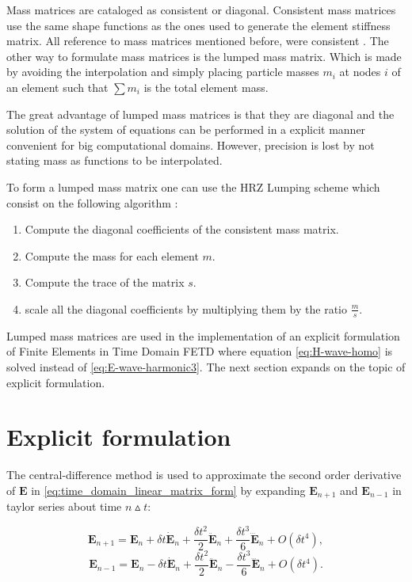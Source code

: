 Mass matrices are cataloged as consistent or diagonal. Consistent mass matrices use the same shape functions as the ones used to generate the element stiffness matrix. All reference to mass matrices mentioned before, were consistent \cite{RobertD.Cook1989}. 
The other way to formulate mass matrices is the lumped mass matrix. Which is made by avoiding the interpolation and simply placing particle masses $m_i$ at nodes $i$ of an element such that $\sum m_i$ is the total element mass. 

The great advantage of lumped mass matrices is that they are diagonal and the solution of the system of equations can be performed in a explicit manner convenient for big computational domains.
However, precision is lost by not stating mass as functions to be interpolated. 

To form a lumped mass matrix one can use the HRZ Lumping scheme 
which consist on the following algorithm \cite{RobertD.Cook1989}:

\begin{enumerate}
\item Compute the diagonal coefficients of the consistent mass matrix.
\item Compute the mass for each element $m$.
\item Compute the trace of the matrix $s$.
\item scale all the diagonal coefficients by multiplying them by the ratio $\frac{m}{s}$.
\end{enumerate}
Lumped mass matrices are used in the implementation of an explicit formulation of Finite Elements in Time Domain FETD where equation \ref{eq:H-wave-homo} is solved instead of \ref{eq:E-wave-harmonic3}. The next section expands on the topic of explicit formulation.

\section{Explicit formulation}

The central-difference method is used to approximate the second order derivative of $\mathbf{E}$ in \ref{eq:time_domain_linear_matrix_form} by expanding $\mathbf{E}_{n+1}$ and $\mathbf{E}_{n-1}$  in taylor series about  time $n \vartriangle t$:

\begin{equation}
\mathbf{E}_{n+1} = \mathbf{E}_n + \delta t \dot{\mathbf{E}}_n +\frac{\delta t^2}{2} \ddot{\mathbf{E}}_n +\frac{\delta t^3}{6} \dddot{\mathbf{E}}_n+ O(\delta t^4),
\label{eq:2d_taylor_exp1}
\end{equation}
\begin{equation}
\mathbf{E}_{n-1} = \mathbf{E}_n - \delta t \dot{\mathbf{E}}_n +\frac{\delta t^2}{2} \ddot{\mathbf{E}}_n-\frac{\delta t^3}{6} \dddot{\mathbf{E}}_n+ O(\delta t^4).
\label{eq:2d_taylor_exp2}
\end{equation}


